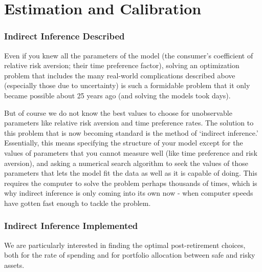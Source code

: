 \documentclass{article}
\begin{document}
\section{Estimation and Calibration}

\subsubsection{Indirect Inference Described}

Even if you knew all the parameters of the model (the consumer's coefficient of relative risk aversion; their time preference factor), solving an optimization problem that includes the many real-world complications described above (especially those due to uncertainty) is such a formidable problem that it only became possible about 25 years ago (and solving the models took days).

But of course we do not know the best values to choose for unobservable parameters like relative risk aversion and time preference rates. The solution to this problem that is now becoming standard is the method of `indirect inference.' Essentially, this means specifying the structure of your model except for the values of parameters that you cannot measure well (like time preference and risk aversion), and asking a numerical search algorithm to seek the values of those parameters that lets the model fit the data as well as it is capable of doing. This requires the computer to solve the problem perhaps thousands of times, which is why indirect inference is only coming into its own now - when computer speeds have gotten fast enough to tackle the problem.

\subsubsection{Indirect Inference Implemented}

We are particularly interested in finding the optimal post-retirement choices, both for the rate of spending and for portfolio allocation between safe and risky assets.
\end{document}
